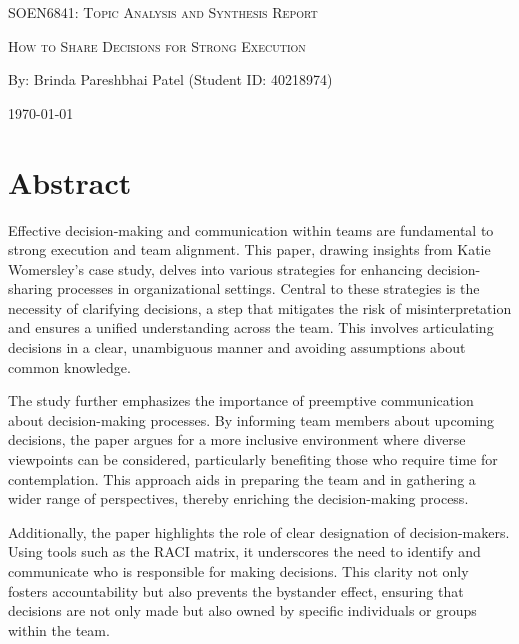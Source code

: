\documentclass[12pt]{article}
\begin{document}
\begin{titlepage}
    \centering
     \vspace{2cm}
    {\scshape\Large SOEN6841: Topic Analysis and Synthesis Report \par}
    \vspace{1.5cm}
    {\scshape\Huge How to Share Decisions for Strong Execution\par}
    \vspace{1.5cm}
    \vspace{1.5cm}
    {\large By: Brinda Pareshbhai Patel (Student ID: 40218974)\par}
    \vspace{1cm}
    {\large \today\par}
\end{titlepage}

\tableofcontents
\newpage

\section*{Abstract}

Effective decision-making and communication within teams are fundamental to strong execution and team alignment. This paper, drawing insights from Katie Womersley's case study, delves into various strategies for enhancing decision-sharing processes in organizational settings. Central to these strategies is the necessity of clarifying decisions, a step that mitigates the risk of misinterpretation and ensures a unified understanding across the team. This involves articulating decisions in a clear, unambiguous manner and avoiding assumptions about common knowledge.

The study further emphasizes the importance of preemptive communication about decision-making processes. By informing team members about upcoming decisions, the paper argues for a more inclusive environment where diverse viewpoints can be considered, particularly benefiting those who require time for contemplation. This approach aids in preparing the team and in gathering a wider range of perspectives, thereby enriching the decision-making process.

Additionally, the paper highlights the role of clear designation of decision-makers. Using tools such as the RACI matrix, it underscores the need to identify and communicate who is responsible for making decisions. This clarity not only fosters accountability but also prevents the bystander effect, ensuring that decisions are not only made but also owned by specific individuals or groups within the team.
\end{document}
